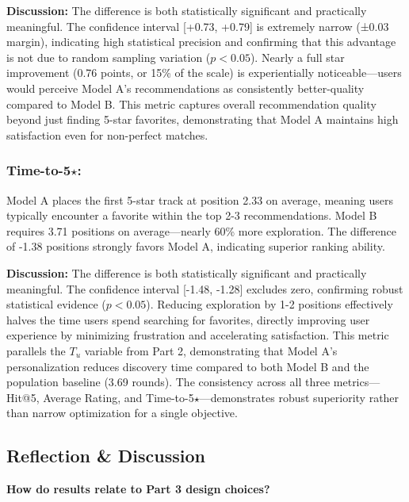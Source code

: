 \documentclass[12pt,a4paper]{article}
\begin{document}
\textbf{Discussion:} The difference is both statistically significant and practically meaningful. The confidence interval [+0.73, +0.79] is extremely narrow (±0.03 margin), indicating high statistical precision and confirming that this advantage is not due to random sampling variation ($p < 0.05$). Nearly a full star improvement (0.76 points, or 15\% of the scale) is experientially noticeable—users would perceive Model A's recommendations as consistently better-quality compared to Model B. This metric captures overall recommendation quality beyond just finding 5-star favorites, demonstrating that Model A maintains high satisfaction even for non-perfect matches.

\subsubsection{Time-to-5$\star$:}

Model A places the first 5-star track at position 2.33 on average, meaning users typically encounter a favorite within the top 2-3 recommendations. Model B requires 3.71 positions on average—nearly 60\% more exploration. The difference of -1.38 positions strongly favors Model A, indicating superior ranking ability.

\textbf{Discussion:} The difference is both statistically significant and practically meaningful. The confidence interval [-1.48, -1.28] excludes zero, confirming robust statistical evidence ($p < 0.05$). Reducing exploration by 1-2 positions effectively halves the time users spend searching for favorites, directly improving user experience by minimizing frustration and accelerating satisfaction. This metric parallels the $T_u$ variable from Part 2, demonstrating that Model A's personalization reduces discovery time compared to both Model B and the population baseline (3.69 rounds). The consistency across all three metrics—Hit@5, Average Rating, and Time-to-5$\star$—demonstrates robust superiority rather than narrow optimization for a single objective.

\subsection{Reflection \& Discussion}

\textbf{How do results relate to Part 3 design choices?}
\end{document}
